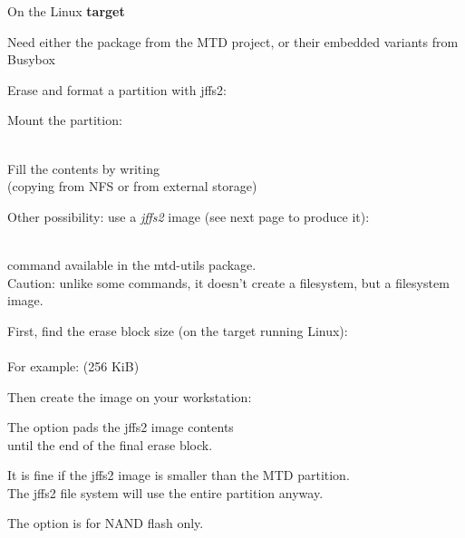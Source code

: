   On the Linux {\bf target}
  \startitemize
  \item Need either the  package from the MTD project,
    or their embedded variants from Busybox
  \item Erase and format a partition with jffs2:\\
  \item Mount the partition:\\
    \\
  \item Fill the contents by writing\\
    (copying from NFS or from external storage)
  \item Other possibility: use a {\em jffs2} image (see next page to
    produce it):\\
    \\
  \stopitemize

  \startitemize
  \item {} command available in the mtd-utils package.\\
    Caution: unlike some  commands, it doesn't create a
    filesystem, but a filesystem image.
  \item First, find the erase block size (on the target running Linux):\\
     \\
    For example:  (256 KiB)
  \item Then create the image on your workstation:\\
  \item The  option pads the jffs2 image contents\\
    until the end of the final erase block.
  \item It is fine if the jffs2 image is smaller than the MTD partition.\\
    The jffs2 file system will use the entire partition anyway.
  \item The  option is for NAND flash only.
  \stopitemize

